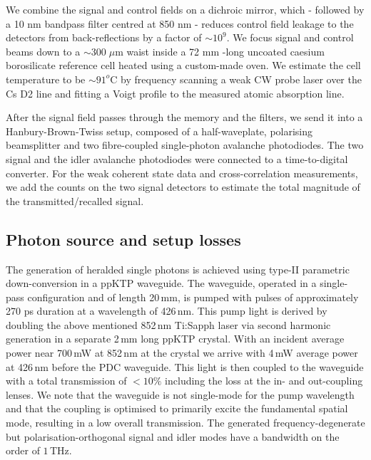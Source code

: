 We combine the signal and control fields on a dichroic mirror, which - followed by a 10 nm bandpass filter centred at 850 nm - reduces control field leakage to the detectors from back-reflections by a factor of $\sim10^9$. We focus signal and control beams down to a $\sim300\;\mu$m waist inside a 72 mm -long uncoated caesium borosilicate reference cell heated using a custom-made oven. We estimate the cell temperature to be $\sim 91^o$C by frequency scanning a weak CW probe laser over the Cs D2 line and fitting a Voigt profile to the measured atomic absorption line.

After the signal field passes through the memory and the filters, we send it into a Hanbury-Brown-Twiss setup, composed of a half-waveplate, polarising beamsplitter and two fibre-coupled single-photon avalanche photodiodes. The two signal and the idler avalanche photodiodes were connected to a time-to-digital converter. For the weak coherent state data and cross-correlation measurements, we add the counts on the two signal detectors to estimate the total magnitude of the transmitted/recalled signal.

\subsection{Photon source and setup losses}
The generation of heralded single photons is achieved using type-II parametric down-conversion in a ppKTP waveguide. The waveguide, operated in a single-pass configuration and of length 20$\,$mm, is pumped with pulses of approximately 270 ps duration at a wavelength of 426\,nm. This pump light is derived by doubling the above mentioned 852\,nm Ti:Sapph laser via second harmonic generation in a separate 2$\,$mm long ppKTP crystal. With an incident average power near 700\,mW at 852\,nm at the crystal we arrive with 4\,mW average power at 426\,nm before the PDC waveguide. This light is then coupled to the waveguide with a total transmission of $<10\%$ including the loss at the in- and out-coupling lenses. We note that the waveguide is not single-mode for the pump wavelength and that the coupling is optimised to primarily excite the fundamental spatial mode, resulting in a low overall transmission. The generated frequency-degenerate but polarisation-orthogonal signal and idler modes have a bandwidth on the order of $1\,$THz. 

